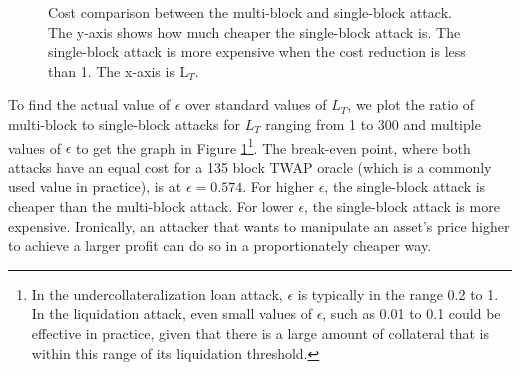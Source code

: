 \begin{figure}[h]
\caption{Cost comparison between the multi-block and single-block attack. The y-axis shows how much cheaper the single-block attack is. The single-block attack is more expensive when the cost reduction is less than 1. The x-axis is L$_T$.}
\label{figureCostDiff}
\end{figure}
To find the actual value of $\epsilon$ over standard values of $L_T$, we plot the ratio of multi-block to single-block attacks for $L_T$ ranging from 1 to 300 and multiple values of $\epsilon$ to get the graph in Figure \ref{figureCostDiff}\footnote{In the undercollateralization loan attack, $\epsilon$ is typically in the range 0.2 to 1. In the liquidation attack, even small values of $\epsilon$, such as 0.01 to 0.1 could be effective
in practice, given that there is a large amount of collateral that is within this range of its liquidation threshold.}. The break-even point, where both attacks have an equal cost for a 135 block TWAP oracle (which is a commonly used value in practice), is at $\epsilon = 0.574$. For higher $\epsilon$, the single-block attack is cheaper than the multi-block attack. For lower $\epsilon$, the single-block attack is more expensive. Ironically, an attacker that wants to manipulate an asset's price higher to achieve a larger profit can do so in a proportionately cheaper way. 


